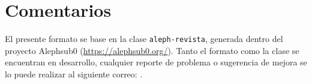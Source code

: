 \documentclass{aleph-revista}
\begin{document}
\section{Comentarios}

El presente formato se base en la clase \texttt{aleph-revista}, generada dentro del proyecto Alephsub0 (\url{https://alephsub0.org/}). Tanto el formato como la clase se encuentran en desarrollo, cualquier reporte de problema o sugerencia de mejora se lo puede realizar al siguiente correo: 
.


\printbibliography
\end{document}
